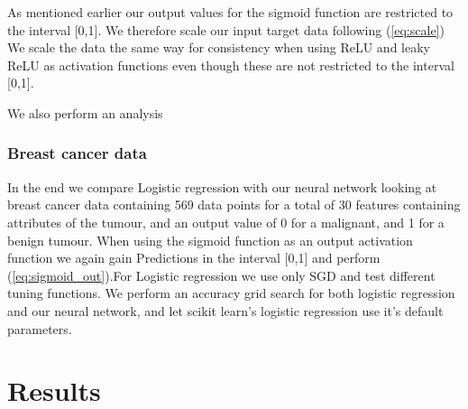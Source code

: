 \documentclass[11pt]{article}
\begin{document}
As mentioned earlier our output values for the sigmoid function are restricted to the interval [0,1]. We therefore scale our input target data following (\ref{eq:scale})
We scale the data the same way for consistency when using ReLU and leaky ReLU as activation functions even though these are not restricted to the interval [0,1].

We also perform an analysis

\subsubsection*{Breast cancer data}
In the end we compare Logistic regression with our neural network looking at breast cancer data containing 569 data points for a total of 30 features containing attributes of the tumour, and an output value of 0 for a malignant, and 1 for a benign tumour. When using the sigmoid function as an output activation function we again gain Predictions in the interval [0,1] and perform (\ref{eq:sigmoid_out}).For Logistic regression we use only SGD and test different tuning functions. We perform an accuracy grid search for both logistic regression and our neural network, and let scikit learn's logistic regression use it's default parameters.

\section{Results}
\end{document}
